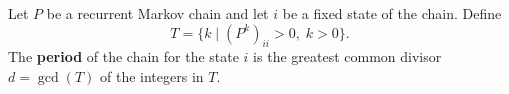 Let $P$ be a recurrent Markov chain and let $i$ be a fixed state of the chain. Define
$$T = \{k \mid (P^k)_{ii} > 0,\; k > 0\}.$$
The \textbf{period} of the chain for the state $i$ is the greatest common divisor $d = \gcd(T)$ of the integers in $T$.
